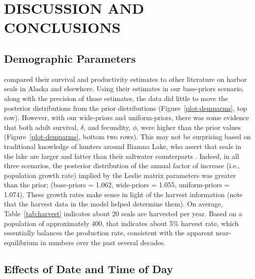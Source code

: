 \documentclass[12pt, titlepage]{article}\usepackage[]{graphicx}\usepackage[]{color}
\begin{document}
\section{DISCUSSION AND CONCLUSIONS}



\subsection{Demographic Parameters}

\citet{Hast:Smal:Pend:sex:2012} compared their survival and productivity estimates to other literature on harbor seals in Alaska and elsewhere.  Using their estimates in our base-priors scenario, along with the precision of those estimates, the data did little to move the posterior distributions from the prior distributions (Figure~\ref{plot-demparms}, top row).  However, with our wide-priors and uniform-priors, there was some evidence that both adult survival, $\delta$, and fecundity, $\phi$, were higher than the prior values (Figure~\ref{plot-demparms}, bottom two rows).  This may not be surprising based on traditional knowledge of hunters around Iliamna Lake, who assert that seals in the lake are larger and fatter than their saltwater counterparts \citep{Burn:Van:With:Hole:Asko:inte:2016}. Indeed, in all three scenarios, the posterior distribution of the annual factor of increase (i.e., population growth rate) implied by the Leslie matrix parameters was greater than the prior; (base-priors = 1.062, wide-priors = 1.055, uniform-priors = 1.074).  These growth rates make sense in light of the harvest information (note that the harvest data in the model helped determine them).  On average, Table~\ref{tab:harvest} indicates about 20 seals are harvested per year.  Based on a population of approximately 400, that indicates about 5\% harvest rate, which essentially balances the production rate, consistent with the apparent near-equilibrium in numbers over the past several decades.

\subsection{Effects of Date and Time of Day}
\end{document}
